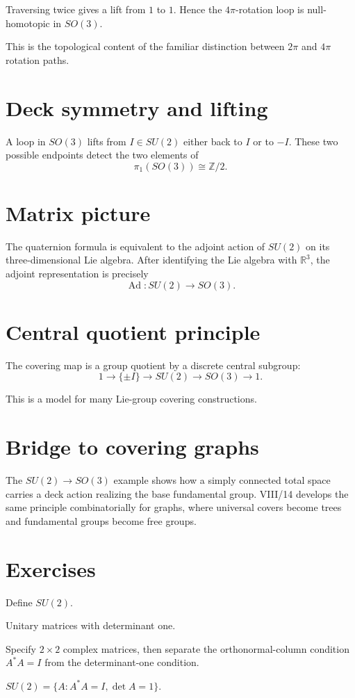 Traversing twice gives a lift from \(1\) to \(1\).  Hence the \(4\pi\)-rotation
loop is null-homotopic in \(SO(3)\).

This is the topological content of the familiar distinction between \(2\pi\)
and \(4\pi\) rotation paths.

\section{Deck symmetry and lifting}

A loop in \(SO(3)\) lifts from \(I\in SU(2)\) either back to \(I\) or to
\(-I\).  These two possible endpoints detect the two elements of
\[
\pi_1(SO(3))\cong\mathbb Z/2.
\]

\section{Matrix picture}

The quaternion formula is equivalent to the adjoint action of \(SU(2)\) on its
three-dimensional Lie algebra.  After identifying the Lie algebra with
\(\mathbb R^3\), the adjoint representation is precisely
\[
\operatorname{Ad}:SU(2)\to SO(3).
\]

\section{Central quotient principle}

The covering map is a group quotient by a discrete central subgroup:
\[
1\longrightarrow\{\pm I\}
\longrightarrow SU(2)
\longrightarrow SO(3)
\longrightarrow1.
\]

This is a model for many Lie-group covering constructions.

\section{Bridge to covering graphs}

The \(SU(2)\to SO(3)\) example shows how a simply connected total space carries
a deck action realizing the base fundamental group.  VIII/14 develops the
same principle combinatorially for graphs, where universal covers become trees
and fundamental groups become free groups.


\section{Exercises}

\begin{exercise}\label{exr:viii13-01}
Define \(SU(2)\).
\end{exercise}
\begin{hint}
Unitary matrices with determinant one.

Specify \(2\times2\) complex matrices, then separate the orthonormal-column condition \(A^*A=I\) from the determinant-one condition.
\end{hint}
\begin{solution}
\(SU(2)=\{A:A^*A=I,\det A=1\}\).
\end{solution}

